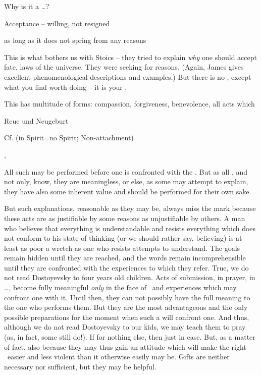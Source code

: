 \pa
Why is it a \sch\ldots?




\pa
Acceptance -- willing, not resigned

as long as it does not spring from any reasons

This is what bothers us with Stoics -- they tried to explain {\em why}
one should accept fate, laws of the universe.  They were seeking for
reasons.  (Again, James gives excellent phenomenological descriptions 
and examples.) But there is no , except what you find worth 
doing -- it is your . 

This has multitude of forms: compassion, forgiveness, benevolence, all 
acts which 


\pa
Reue und Neugeburt

Cf.  (in Spirit=no Spirit; Non-attachment)

\sep

\pa
All such  may be performed before one is confronted with 
the \sch. But as all , and not only, know, they are 
meaningless, or else, as some may attempt to explain, they have also 
some inherent value and should be performed for their own sake. 

But such explanations, reasonable as they may be, always miss the mark
because these acts are as justifiable by some  reasons as
unjustifiable by others.  A man who believes that everything is
understandable and resists everything which does not conform to his
state of thinking (or we should rather say, believing) is at least as
poor a wretch as one who resists attempts to understand.  The goals
remain hidden until they are reached, and the words remain
incomprehensible until they are confronted with the experiences to
which they refer.  True, we do not read Dostoyevsky to four years old
children.  Acts of submission, in prayer, in \ldots, become fully
meaningful {\em only} in the face of \sch\ and experiences which may
confront one with it.  Until then, they can not possibly have the full
meaning to the one who performs them.  But they are the most
advantageous and the only possible preparations for the moment when
such a  will confront one.  And thus, although we do not
read Dostoyevsky to our kids, we may teach them to pray (as, in fact,
some still do!).  If for nothing else, then just in case.  But, as a
matter of fact, also because they may thus gain an attitude which will
make the right \sch\ easier and less violent than it otherwise easily
may be.  Gifts are neither necessary nor sufficient, but they may be
helpful.

